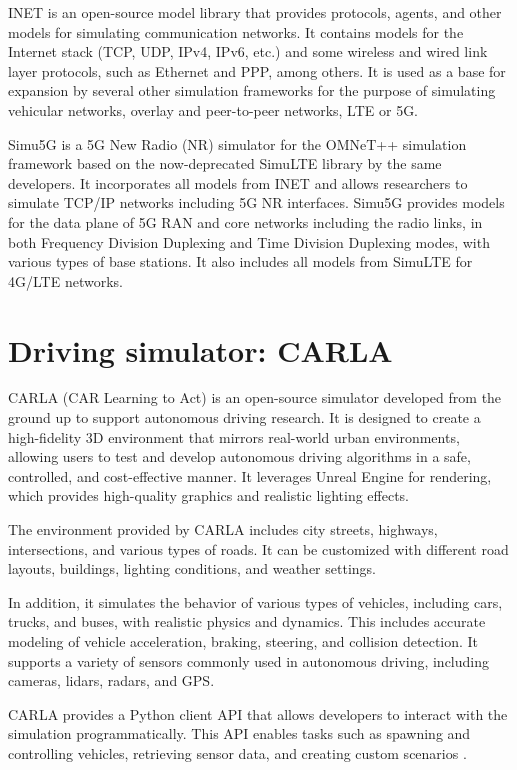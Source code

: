 INET \cite{inetwebsite} is an open-source model library that provides protocols, agents, and other models for simulating communication networks. It contains models for the Internet stack (TCP, UDP, IPv4, IPv6, etc.) and some wireless and wired link layer protocols, such as Ethernet and PPP, among others. It is used as a base for expansion by several other simulation frameworks for the purpose of simulating vehicular networks, overlay and peer-to-peer networks, LTE or 5G.

Simu5G \cite{simu5gwebsite} \cite{9211504} is a 5G New Radio (NR) simulator for the OMNeT++ simulation framework based on the now-deprecated SimuLTE library by the same developers. It incorporates all models from INET and allows researchers to simulate TCP/IP networks including 5G NR interfaces. Simu5G provides models for the data plane of 5G RAN and core networks including the radio links, in both Frequency Division Duplexing and Time Division Duplexing modes, with various types of base stations. It also includes all models from SimuLTE for 4G/LTE networks.




\section{Driving simulator: CARLA}

CARLA (CAR Learning to Act) is an open-source simulator developed from the ground up to support autonomous driving research. It is designed to create a high-fidelity 3D environment that mirrors real-world urban environments, allowing users to test and develop autonomous driving algorithms in a safe, controlled, and cost-effective manner. It leverages Unreal Engine for rendering, which provides high-quality graphics and realistic lighting effects.

The environment provided by CARLA includes city streets, highways, intersections, and various types of roads. It can be customized with different road layouts, buildings, lighting conditions, and weather settings.

In addition, it simulates the behavior of various types of vehicles, including cars, trucks, and buses, with realistic physics and dynamics. This includes accurate modeling of vehicle acceleration, braking, steering, and collision detection. It supports a variety of sensors commonly used in autonomous driving, including cameras, lidars, radars, and GPS.

CARLA provides a Python client API that allows developers to interact with the simulation programmatically. This API enables tasks such as spawning and controlling vehicles, retrieving sensor data, and creating custom scenarios \cite{carla-pmlr-v78-dosovitskiy17a}.

